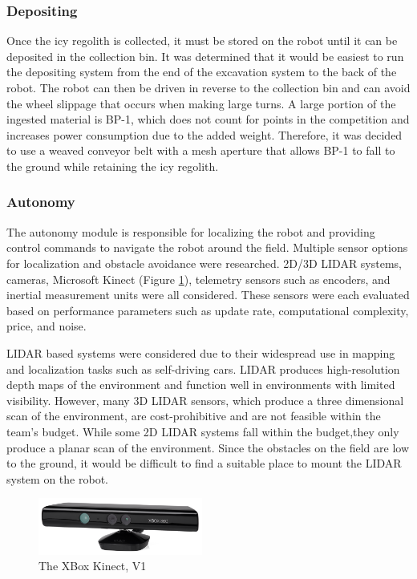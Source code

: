 \documentclass[class=article, crop=false]{standalone}
\begin{document}
	
	\subsubsection{Depositing}
	Once the icy regolith is collected, it must be stored on the robot until it can be deposited in the collection bin. It was determined that it would be easiest to run the depositing system from the end of the excavation system to the back of the robot. The robot can then be driven in reverse to the collection bin and can avoid the wheel slippage that occurs when making large turns. A large portion of the ingested material is BP-1, which does not count for points in the competition and increases power consumption due to the added weight. Therefore, it was decided to use a weaved conveyor belt with a mesh aperture that allows BP-1 to fall to the ground while retaining the icy regolith.
	
	
	\subsubsection{Autonomy}
	The autonomy module is responsible for localizing the robot and providing control commands to navigate the robot around the field. Multiple sensor options for localization and obstacle avoidance were researched. 2D/3D LIDAR systems, cameras, Microsoft Kinect (Figure \ref{fig:kinect-pic}), telemetry sensors such as encoders, and inertial measurement units were all considered. These sensors were each evaluated based on performance parameters such as update rate, computational complexity, price, and noise.
	
	LIDAR based systems were considered due to their widespread use in mapping and localization tasks such as self-driving cars. LIDAR produces high-resolution depth maps of the environment and function  well in environments with limited visibility. However, many 3D LIDAR sensors, which produce a three dimensional scan of the environment, are cost-prohibitive and are not feasible within the team’s budget. While some 2D LIDAR systems fall within the budget,they only produce a planar scan of the environment. Since the obstacles on the field are low to the ground, it would be difficult to find a suitable place to mount the LIDAR system on the robot. 
	
	\begin{figure}
	\centering
	 \includegraphics[width=0.48\textwidth]{09_Figures/xbox-360-kinect.png}
	 \caption{The XBox Kinect, V1}
	 \label{fig:kinect-pic}
	\end{figure}
	
\end{document}
